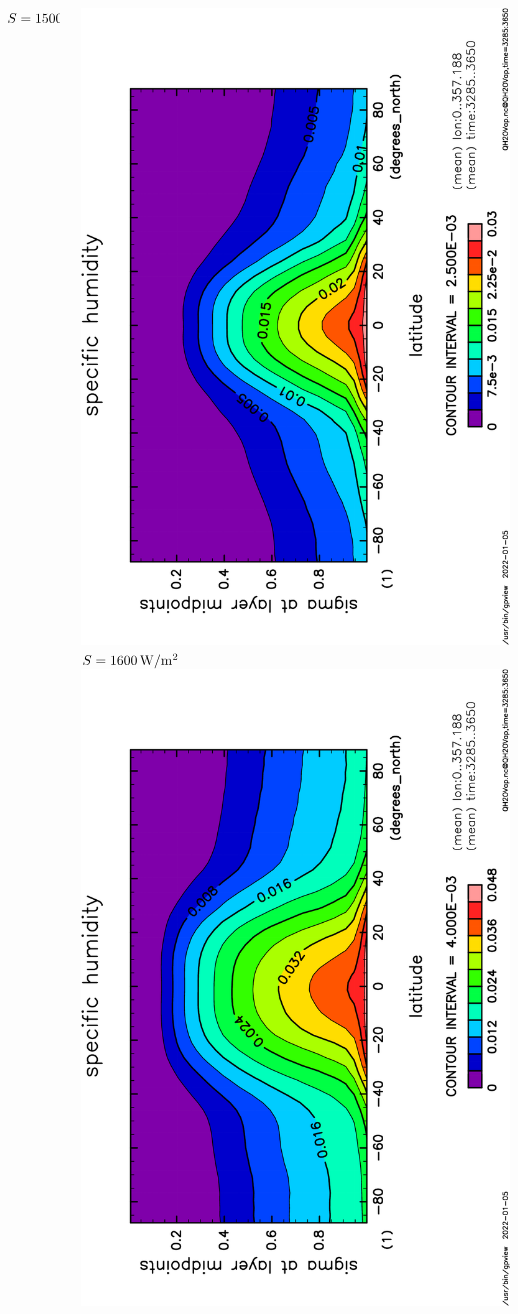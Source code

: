 \documentclass[aspectratio=149,9pt,fleqn]{beamer}
\begin{document}
\begin{frame}
\begin{columns}[T]
\begin{column}{.3\textwidth}
			\(S=1500\hmu{W/m^2}\)
		\end{column}
		\begin{column}{.3\textwidth}
			\centering
			\includegraphics[height=\textwidth,angle=-90]{S1600/QH2OVap,time=3285:3650-crop.pdf}
			\(S=1600\hmu{W/m^2}\)\\
			\includegraphics[height=\textwidth,angle=-90]{S1800/QH2OVap,time=3285:3650-crop.pdf}

\end{column}
\end{columns}
\end{frame}
\end{document}
